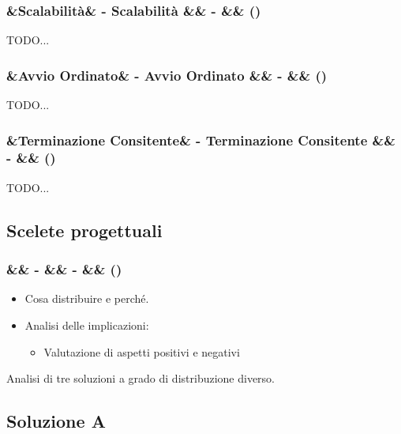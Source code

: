 \documentclass[slidestop,compress,blackandwhite]{beamer}
\newcommand{\ii}[1]{\textit{#1}}
\newcommand{\treno}{\ii{treno}}
\newcommand{\treni}{\ii{treni}}
\newcommand{\viaggiatore}{\ii{viaggiatore}}
\newcommand{\viaggiatori}{\ii{viaggiatori}}
\newcommand{\stazione}{\ii{stazione}}
\newcommand{\stazioni}{\ii{stazioni}}
\newcommand{\biglietteria}{\ii{biglietteria}}
\newcommand{\controller}{\ii{controllo centrale}}
\newcommand{\newtitle}[4]{
	#1 
	\ifx&#2&%
	\else
  		\large- #2
	\fi
	\ifx&#3&%
	\else
  		\normalsize- #3
	\fi
	\ifx&#4&%
	\else
  		\normalsize (#4)
	\fi
}
\newcommand{\newframe}[5]{
	\begin{frame}
		\frametitle{\newtitle{#1}{#2}{#3}{#4}}
		#5
	\end{frame}
}
\newcommand{\myitemize}[1]{\begin{itemize}#1\end{itemize}}
\begin{document}
	
	\newframe{}{Scalabilità}{}{}{
		TODO...
	}

	
	\newframe{}{Avvio Ordinato}{}{}{
		TODO...
	}
	
	
	\newframe{}{Terminazione Consitente}{}{}{
		TODO...
	}
	
	\subsection{Scelete progettuali}\label{scelte}
	
	\newframe{}{}{}{}{
		
		\begin{itemize}
			\item Cosa distribuire e perché.
			\item Analisi delle implicazioni:
				\myitemize{
					\item Valutazione di aspetti positivi e negativi
				}
		\end{itemize}
		
		Analisi di tre soluzioni a grado di distribuzione diverso. 
		
	}
	
	\subsection{Soluzione A}
	
	
\end{document}
